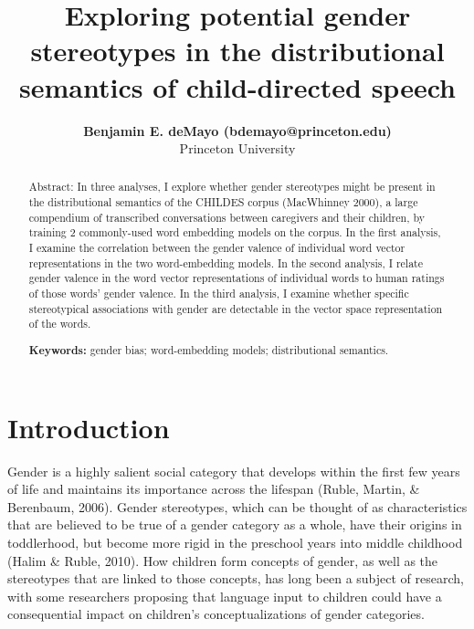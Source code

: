 \documentclass[10pt, letterpaper]{article}
\title{Exploring potential gender stereotypes in the distributional
semantics of child-directed speech}
\author{{\large \bf Benjamin E. deMayo (bdemayo@princeton.edu)} \\ Princeton University}
\begin{document}
\maketitle

\begin{abstract}
Abstract: In three analyses, I explore whether gender stereotypes might
be present in the distributional semantics of the CHILDES corpus
(MacWhinney 2000), a large compendium of transcribed conversations
between caregivers and their children, by training 2 commonly-used word
embedding models on the corpus. In the first analysis, I examine the
correlation between the gender valence of individual word vector
representations in the two word-embedding models. In the second
analysis, I relate gender valence in the word vector representations of
individual words to human ratings of those words' gender valence. In the
third analysis, I examine whether specific stereotypical associations
with gender are detectable in the vector space representation of the
words.

\textbf{Keywords:}
gender bias; word-embedding models; distributional semantics.
\end{abstract}

\hypertarget{introduction}{%
\section{Introduction}\label{introduction}}

Gender is a highly salient social category that develops within the
first few years of life and maintains its importance across the lifespan
(Ruble, Martin, \& Berenbaum, 2006). Gender stereotypes, which can be
thought of as characteristics that are believed to be true of a gender
category as a whole, have their origins in toddlerhood, but become more
rigid in the preschool years into middle childhood (Halim \& Ruble,
2010). How children form concepts of gender, as well as the stereotypes
that are linked to those concepts, has long been a subject of research,
with some researchers proposing that language input to children could
have a consequential impact on children's conceptualizations of gender
categories.
\end{document}
